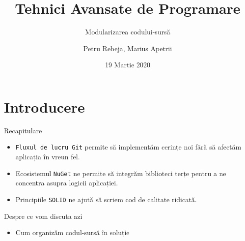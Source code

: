 \documentclass[presentation]{beamer}
\author{Petru Rebeja, Marius Apetrii}
\date{19 Martie 2020}
\title{Tehnici Avansate de Programare}
\subtitle{Modularizarea codului-sursă}
\institute[UAIC]{Facultatea de Matematică\\Universitatea Alexandru Ioan Cuza, Iași}
\begin{document}
\maketitle
\section{Introducere}
\label{sec:org67630a6}
\begin{frame}[label={sec:org3bc015e},fragile]{Recapitulare}
 \begin{itemize}
\item \texttt{Fluxul de lucru Git} permite să implementăm cerințe noi fără să afectăm aplicația în vreun fel.
\item Ecosistemul \texttt{NuGet} ne permite să integrăm biblioteci terțe pentru a ne concentra asupra logicii aplicației.
\item Principiile \texttt{SOLID} ne ajută să scriem cod de calitate ridicată.
\end{itemize}
\end{frame}
\begin{frame}[label={sec:org698ceaf}]{Despre ce vom discuta azi}
\begin{itemize}
\item Cum organizăm codul-sursă în soluție
\end{itemize}
\end{frame}
\end{document}
